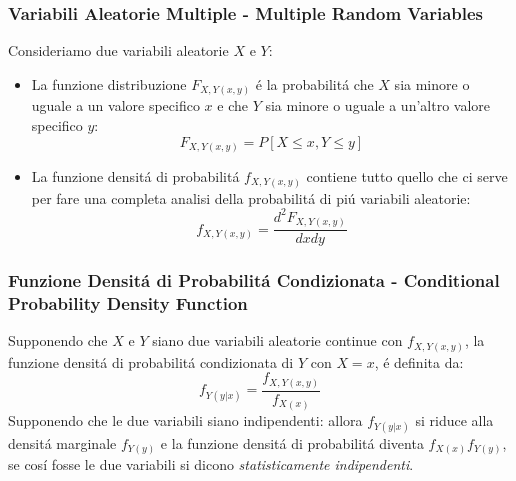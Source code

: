         \subsubsection{Variabili Aleatorie Multiple - Multiple Random Variables}
            Consideriamo due variabili aleatorie $X$ e $Y$:
            \begin{itemize}
                \item {
                    La funzione distribuzione $F_{X,Y (x,y)}$ é la probabilitá che $X$ sia minore o uguale a un valore specifico $x$ e che $Y$
                    sia minore o uguale a un'altro valore specifico $y$:
                    \[
                        F_{X,Y (x,y)} = P[X\leq x,Y\leq y]    
                    \]
                }
                \item {
                    La funzione densitá di probabilitá $f_{X,Y (x,y)}$ contiene tutto quello che ci serve per fare una completa analisi della probabilitá
                    di piú variabili aleatorie:
                    \[
                        f_{X,Y (x,y)} = \frac{d^2 F_{X,Y (x,y)}}{dxdy}     
                    \]

                }
            \end{itemize}
        \subsubsection{Funzione Densitá di Probabilitá Condizionata - Conditional Probability Density Function}
            Supponendo che $X$ e $Y$ siano due variabili aleatorie continue con $f_{X,Y (x,y)}$, la funzione densitá di probabilitá condizionata di $Y$ con $X=x$,
            é definita da:
            \[
                f_{Y (y|x)} = \frac{f_{X,Y (x,y)}}{f_{X(x)}}     
            \]
            Supponendo che le due variabili siano indipendenti: allora $f_{Y (y|x)}$ si riduce alla densitá marginale $f_{Y (y)}$ e la funzione densitá di
            probabilitá diventa $f_{X (x)}f_{Y (y)}$, se cosí fosse le due variabili si dicono \emph{statisticamente indipendenti}.
